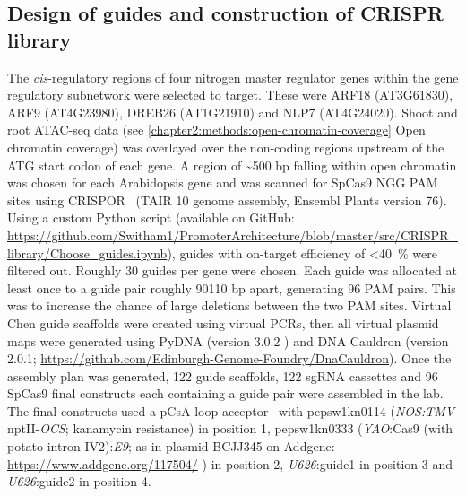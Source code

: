 \documentclass[../main.tex]{subfiles}
\begin{document}
\subsection{Design of guides and construction of CRISPR library}\label{chapter2:methods:design-of-guides}
The \textit{cis}\hyp{}regulatory regions of four nitrogen master regulator genes within the gene regulatory subnetwork were selected to target.
These were ARF18 (AT3G61830), ARF9 (AT4G23980), DREB26 (AT1G21910) and NLP7 (AT4G24020).
Shoot and root ATAC-seq data \autocite{potterCytokininModulatesContextdependent2018} (see \autoref{chapter2:methods:open-chromatin-coverage} Open chromatin coverage) was overlayed over the non-coding regions upstream of the ATG start codon of each gene.
A region of \textasciitilde{}500 bp falling within open chromatin was chosen for each Arabidopsis gene and was scanned for SpCas9 NGG PAM sites using CRISPOR~\autocite{concordetCRISPORIntuitiveGuide2018} (TAIR 10 \autocite{lameschArabidopsisInformationResource2012} genome assembly, Ensembl Plants \autocite{howeEnsemblGenomes20202020} version 76).
Using a custom Python \autocite{pythoncoreteamPythonDynamicOpen2020} script (available on GitHub: \url{https://github.com/Switham1/PromoterArchitecture/blob/master/src/CRISPR_library/Choose_guides.ipynb}), guides with on\hyp{}target efficiency \autocite{doenchOptimizedSgRNADesign2016} of \textless{}\SI{40}{\percent} were filtered out.
Roughly 30 guides per gene were chosen.
Each guide was allocated at least once to a guide pair roughly 90\textendash{}110 bp apart, generating 96 PAM pairs.
This was to increase the chance of large deletions between the two PAM sites.
Virtual Chen \autocite{chenDynamicImagingGenomic2013} guide scaffolds were created using virtual PCRs, then all virtual plasmid maps were generated using PyDNA (version 3.0.2 \autocite{pereiraPydnaSimulationDocumentation2015}) and DNA Cauldron (version 2.0.1; \url{https://github.com/Edinburgh-Genome-Foundry/DnaCauldron}).
Once the assembly plan was generated, 122 guide scaffolds, 122 sgRNA cassettes and 96 SpCas9 final constructs each containing a guide pair were assembled in the lab.
The final constructs used a pCsA loop acceptor~\autocite{pollakLoopAssemblySimple2018} with pepsw1kn0114 (\textit{NOS:TMV}-nptII-\textit{OCS}; kanamycin resistance) in position 1, pepsw1kn0333 (\textit{YAO}:Cas9 (with potato intron IV2):\textit{E9}; as in plasmid BCJJ345 on Addgene: \url{https://www.addgene.org/117504/} \autocite{castelOptimizationTDNAArchitecture2019}) in position 2, \textit{U626}:guide1 in position 3 and \textit{U626}:guide2 in position 4.
\end{document}
